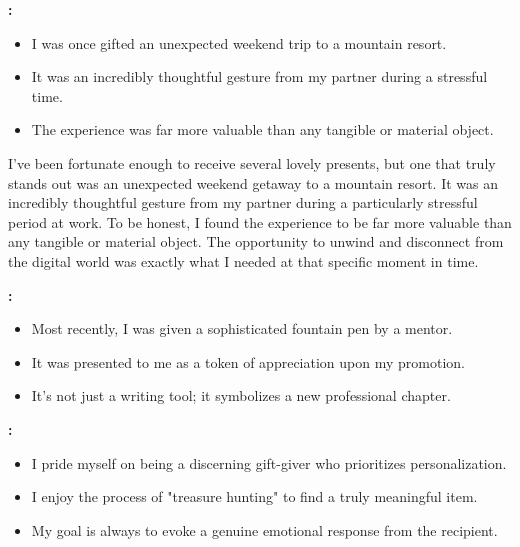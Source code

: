 \vspace{6pt}




\textbf{:}

\begin{itemize}
\tightlist
\item
  I was once gifted an unexpected weekend trip to a mountain resort.
\item
  It was an incredibly thoughtful gesture from my partner during a
  stressful time.
\item
  The experience was far more valuable than any tangible or material
  object.
\end{itemize}

I've been fortunate enough to receive several lovely presents, but one
that truly stands out was an unexpected weekend getaway to a mountain
resort. It was an incredibly thoughtful gesture from my partner during a
particularly stressful period at work. To be honest, I found the
experience to be far more valuable than any tangible or material object.
The opportunity to unwind and disconnect from the digital world was
exactly what I needed at that specific moment in time.


\textbf{:}

\begin{itemize}
\tightlist
\item
  Most recently, I was given a sophisticated fountain pen by a mentor.
\item
  It was presented to me as a token of appreciation upon my promotion.
\item
  It's not just a writing tool; it symbolizes a new professional
  chapter.
\end{itemize}


\textbf{:}

\begin{itemize}
\tightlist
\item
  I pride myself on being a discerning gift-giver who prioritizes
  personalization.
\item
  I enjoy the process of "treasure hunting" to find a truly meaningful
  item.
\item
  My goal is always to evoke a genuine emotional response from the
  recipient.
\end{itemize}

